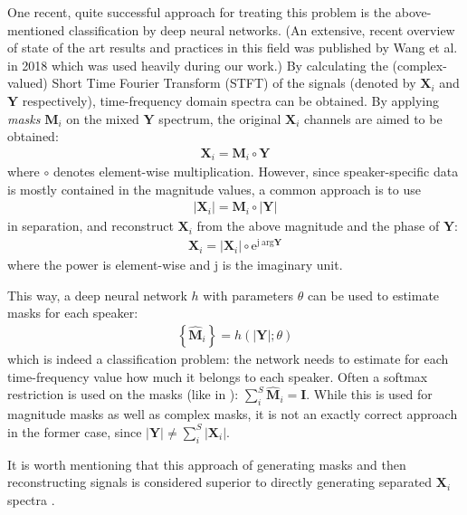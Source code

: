 \documentclass{article}
\newcommand{\mx}[1]{\mathbf{\bm{#1}}}
\begin{document}
One recent, quite successful approach for treating this problem is the above-mentioned classification by deep neural networks. (An extensive, recent overview of state of the art results and practices in this field was published by Wang et al. in 2018 \cite{Wang18} which was used heavily during our work.) By calculating the (complex-valued) Short Time Fourier Transform (STFT) of the signals (denoted by $\mx{X}_i$ and $\mx{Y}$ respectively), time-frequency domain spectra can be obtained. By applying \textit{masks} $\mx{M}_i$ on the mixed $\mx{Y}$ spectrum, the original $\mx{X}_i$ channels are aimed to be obtained:
\begin{gather}
    \mx{X}_i = \mx{M}_i \circ \mx{Y}
\end{gather}
where $\circ$ denotes element-wise multiplication. However, since speaker-specific data is mostly contained in the magnitude values, a common approach is to use
\begin{gather}
    \left| \mx{X}_i \right| = \mx{M}_i \circ \left| \mx{Y} \right|
\end{gather}
in separation, and reconstruct $\mx{X}_i$ from the above magnitude and the phase of $\mx{Y}$:
\begin{gather}
    \mx{X}_i = \left| \mx{X}_i \right| \circ \mathrm{e} ^ {\mathrm{j}\ \mathrm{arg}\mx{Y}}
\end{gather}
where the power is element-wise and $\mathrm{j}$ is the imaginary unit.

This way, a deep neural network $h$ with parameters $\theta$ can be used to estimate masks for each speaker:
\begin{gather}
    \left\{  \hat{\mx{M}}_i \right\} = h( \left| \mx{Y} \right| ; \theta)
\end{gather}
which is indeed a classification problem: the network needs to estimate for each time-frequency value how much it belongs to each speaker. Often a softmax restriction is used on the masks (like in \cite{YuKTJ16}): $\sum_i^S \hat{\mx{M}}_i = \mx{I}$. While this is used for magnitude masks as well as complex masks, it is not an exactly correct approach in the former case, since $\left| \mx{Y} \right| \neq \sum_i^S \left| \mx{X}_i \right|$.

It is worth mentioning that this approach of generating masks and then reconstructing signals is considered superior to directly generating separated $\mx{X}_i$ spectra \cite{Wang14}.
\end{document}
